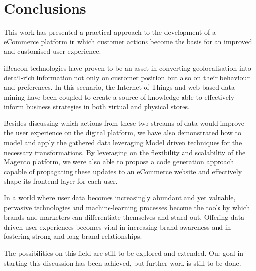 \chapter*{Conclusions}

This work has presented a practical approach to the development of a eCommerce platform in which customer actions become the basis for an improved and customised user experience.

iBeacon technologies have proven to be an asset in converting geolocalisation into detail-rich information not only on customer position but also on their behaviour and preferences. In this scenario, the Internet of Things and web-based data mining have been coupled to create a source of knowledge able to effectively inform business strategies in both virtual and physical stores.

Besides discussing which actions from these two streams of data would improve the user experience on the digital platform, we have also demonstrated how to model and apply the gathered data leveraging Model driven techniques for the necessary transformations. By leveraging on the flexibility and scalability of the Magento platform, we were also able to propose a code generation approach capable of propagating these updates to an eCommerce website and effectively shape its frontend layer for each user.

In a world where user data becomes increasingly abundant and yet valuable, pervasive technologies and machine-learning processes become the tools by which brands and marketers can differentiate themselves and stand out. Offering data-driven user experiences becomes vital in increasing brand awareness and in fostering strong and long brand relationships.

The possibilities on this field are still to be explored and extended. Our goal in starting this discussion has been achieved, but further work is still to be done.


